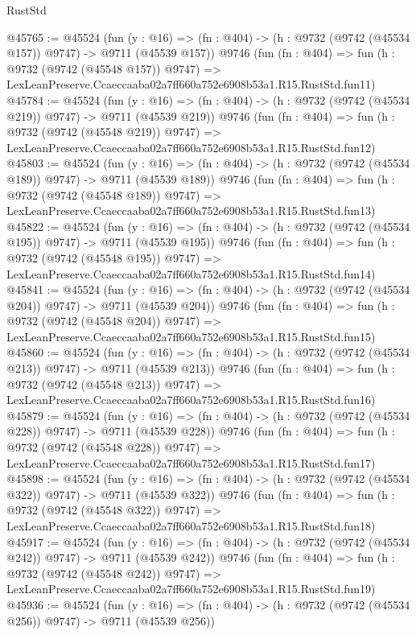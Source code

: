 \begin{lexlean}{RustStd}
\begin{coremodule}
@45765 := @45524
    (fun (y : @16) => (fn : @404) -> (h : @9732 (@9742 (@45534 @157)) @9747) -> @9711 (@45539 @157))
    @9746
    (fun (fn : @404) =>
    fun (h : @9732 (@9742 (@45548 @157)) @9747) =>
    LexLeanPreserve.Ccaeccaaba02a7ff660a752e6908b53a1.R15.RustStd.fun11)
@45784 := @45524
    (fun (y : @16) => (fn : @404) -> (h : @9732 (@9742 (@45534 @219)) @9747) -> @9711 (@45539 @219))
    @9746
    (fun (fn : @404) =>
    fun (h : @9732 (@9742 (@45548 @219)) @9747) =>
    LexLeanPreserve.Ccaeccaaba02a7ff660a752e6908b53a1.R15.RustStd.fun12)
@45803 := @45524
    (fun (y : @16) => (fn : @404) -> (h : @9732 (@9742 (@45534 @189)) @9747) -> @9711 (@45539 @189))
    @9746
    (fun (fn : @404) =>
    fun (h : @9732 (@9742 (@45548 @189)) @9747) =>
    LexLeanPreserve.Ccaeccaaba02a7ff660a752e6908b53a1.R15.RustStd.fun13)
@45822 := @45524
    (fun (y : @16) => (fn : @404) -> (h : @9732 (@9742 (@45534 @195)) @9747) -> @9711 (@45539 @195))
    @9746
    (fun (fn : @404) =>
    fun (h : @9732 (@9742 (@45548 @195)) @9747) =>
    LexLeanPreserve.Ccaeccaaba02a7ff660a752e6908b53a1.R15.RustStd.fun14)
@45841 := @45524
    (fun (y : @16) => (fn : @404) -> (h : @9732 (@9742 (@45534 @204)) @9747) -> @9711 (@45539 @204))
    @9746
    (fun (fn : @404) =>
    fun (h : @9732 (@9742 (@45548 @204)) @9747) =>
    LexLeanPreserve.Ccaeccaaba02a7ff660a752e6908b53a1.R15.RustStd.fun15)
@45860 := @45524
    (fun (y : @16) => (fn : @404) -> (h : @9732 (@9742 (@45534 @213)) @9747) -> @9711 (@45539 @213))
    @9746
    (fun (fn : @404) =>
    fun (h : @9732 (@9742 (@45548 @213)) @9747) =>
    LexLeanPreserve.Ccaeccaaba02a7ff660a752e6908b53a1.R15.RustStd.fun16)
@45879 := @45524
    (fun (y : @16) => (fn : @404) -> (h : @9732 (@9742 (@45534 @228)) @9747) -> @9711 (@45539 @228))
    @9746
    (fun (fn : @404) =>
    fun (h : @9732 (@9742 (@45548 @228)) @9747) =>
    LexLeanPreserve.Ccaeccaaba02a7ff660a752e6908b53a1.R15.RustStd.fun17)
@45898 := @45524
    (fun (y : @16) => (fn : @404) -> (h : @9732 (@9742 (@45534 @322)) @9747) -> @9711 (@45539 @322))
    @9746
    (fun (fn : @404) =>
    fun (h : @9732 (@9742 (@45548 @322)) @9747) =>
    LexLeanPreserve.Ccaeccaaba02a7ff660a752e6908b53a1.R15.RustStd.fun18)
@45917 := @45524
    (fun (y : @16) => (fn : @404) -> (h : @9732 (@9742 (@45534 @242)) @9747) -> @9711 (@45539 @242))
    @9746
    (fun (fn : @404) =>
    fun (h : @9732 (@9742 (@45548 @242)) @9747) =>
    LexLeanPreserve.Ccaeccaaba02a7ff660a752e6908b53a1.R15.RustStd.fun19)
@45936 := @45524
    (fun (y : @16) => (fn : @404) -> (h : @9732 (@9742 (@45534 @256)) @9747) -> @9711 (@45539 @256))

\end{coremodule}
\end{lexlean}
